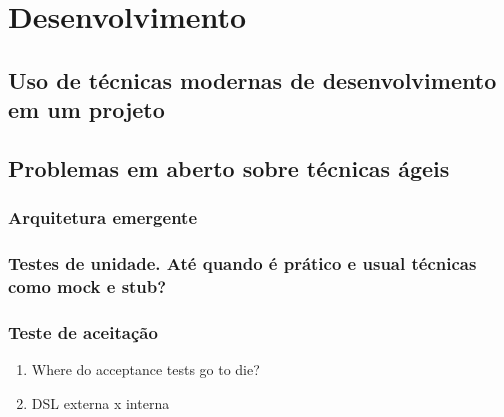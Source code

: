 \chapter{Desenvolvimento}

\section{Uso de técnicas modernas de desenvolvimento em um projeto}


\section{Problemas em aberto sobre técnicas ágeis}

\subsection{Arquitetura emergente}

\subsection{Testes de unidade. Até quando é prático e usual técnicas como mock e stub?}

\subsection{Teste de aceitação}
\begin{enumerate}
\item Where do acceptance tests go to die?
\item DSL externa x interna
\end{enumerate}
